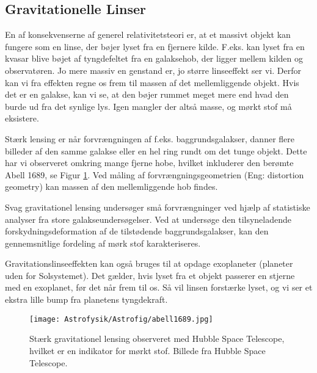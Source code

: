 \subsection{Gravitationelle Linser}

En af konsekvenserne af generel relativitetsteori er, at et massivt objekt kan fungere som en linse, der bøjer lyset fra en fjernere kilde. F.eks. kan lyset fra en kvasar blive bøjet af tyngdefeltet fra en galaksehob, der ligger mellem kilden og observatøren. Jo mere massiv en genstand er, jo større linseeffekt ser vi. Derfor kan vi fra effekten regne os frem til massen af det mellemliggende objekt. Hvis det er en galakse, kan vi se, at den bøjer rummet meget mere end hvad den burde ud fra det synlige lys. Igen mangler der altså masse, og mørkt stof må eksistere.


Stærk lensing er når forvrængningen af f.eks. baggrundsgalakser, danner flere billeder af den samme galakse eller en hel ring rundt om det tunge objekt. Dette har vi observeret omkring mange fjerne hobe, hvilket inkluderer den berømte Abell 1689, se Figur \ref{abell1689}. Ved måling af forvrængningsgeometrien (Eng: distortion geometry) kan massen af den mellemliggende hob findes. %

Svag gravitationel lensing undersøger små forvrængninger ved hjælp af statistiske analyser fra store galakseundersøgelser. Ved at undersøge den tilsyneladende forskydningsdeformation af de tilstødende baggrundsgalakser, kan den gennemsnitlige fordeling af mørk stof karakteriseres.

Gravitationslinseeffekten kan også bruges til at opdage exoplaneter (planeter uden for Solsystemet). Det gælder, hvis lyset fra et objekt passerer en stjerne med en exoplanet, før det når frem til os. Så vil linsen forstærke lyset, og vi ser et ekstra lille bump fra planetens tyngdekraft.

\begin{figure}[h!]
	\centering
	\texttt{[image: Astrofysik/Astrofig/abell1689.jpg]}
	\caption{Stærk gravitationel lensing observeret med Hubble Space Telescope, hvilket er en indikator for mørkt stof. Billede fra Hubble Space Telescope.}
	\label{abell1689}
\end{figure}

